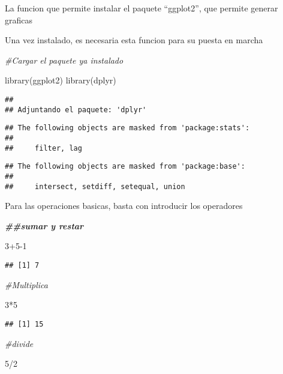 \documentclass[
]{article}
\newenvironment{Shaded}{\begin{snugshade}}{\end{snugshade}}
\newcommand{\CommentTok}[1]{\textcolor[rgb]{0.56,0.35,0.01}{\textit{#1}}}
\newcommand{\DecValTok}[1]{\textcolor[rgb]{0.00,0.00,0.81}{#1}}
\newcommand{\DocumentationTok}[1]{\textcolor[rgb]{0.56,0.35,0.01}{\textbf{\textit{#1}}}}
\newcommand{\FunctionTok}[1]{\textcolor[rgb]{0.00,0.00,0.00}{#1}}
\newcommand{\NormalTok}[1]{#1}
\newcommand{\SpecialCharTok}[1]{\textcolor[rgb]{0.00,0.00,0.00}{#1}}
\begin{document}
La funcion que permite instalar el paquete ``ggplot2'', que permite
generar graficas

Una vez instalado, es necesaria esta funcion para su puesta en marcha

\begin{Shaded}
\begin{Highlighting}[]
\CommentTok{\#Cargar el paquete ya instalado}

\FunctionTok{library}\NormalTok{(ggplot2)}
\FunctionTok{library}\NormalTok{(dplyr)}
\end{Highlighting}
\end{Shaded}

\begin{verbatim}
## 
## Adjuntando el paquete: 'dplyr'
\end{verbatim}

\begin{verbatim}
## The following objects are masked from 'package:stats':
## 
##     filter, lag
\end{verbatim}

\begin{verbatim}
## The following objects are masked from 'package:base':
## 
##     intersect, setdiff, setequal, union
\end{verbatim}

Para las operaciones basicas, basta con introducir los operadores

\begin{Shaded}
\begin{Highlighting}[]
\DocumentationTok{\#\#sumar y restar}

\DecValTok{3}\SpecialCharTok{+}\DecValTok{5{-}1}
\end{Highlighting}
\end{Shaded}

\begin{verbatim}
## [1] 7
\end{verbatim}

\begin{Shaded}
\begin{Highlighting}[]
\CommentTok{\#Multiplica}

\DecValTok{3}\SpecialCharTok{*}\DecValTok{5}
\end{Highlighting}
\end{Shaded}

\begin{verbatim}
## [1] 15
\end{verbatim}

\begin{Shaded}
\begin{Highlighting}[]
\CommentTok{\#divide}

\DecValTok{5}\SpecialCharTok{/}\DecValTok{2}
\end{Highlighting}
\end{Shaded}
\end{document}
